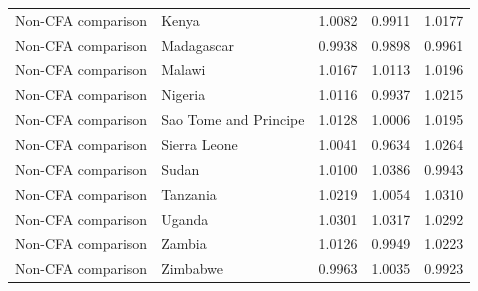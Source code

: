 \begin{table}
\begin{tabular}[t]{llrrr}
Non-CFA comparison & Kenya & 1.0082 & 0.9911 & 1.0177\\
\addlinespace
Non-CFA comparison & Madagascar & 0.9938 & 0.9898 & 0.9961\\
Non-CFA comparison & Malawi & 1.0167 & 1.0113 & 1.0196\\
Non-CFA comparison & Nigeria & 1.0116 & 0.9937 & 1.0215\\
Non-CFA comparison & Sao Tome and Principe & 1.0128 & 1.0006 & 1.0195\\
Non-CFA comparison & Sierra Leone & 1.0041 & 0.9634 & 1.0264\\
\addlinespace
Non-CFA comparison & Sudan & 1.0100 & 1.0386 & 0.9943\\
Non-CFA comparison & Tanzania & 1.0219 & 1.0054 & 1.0310\\
Non-CFA comparison & Uganda & 1.0301 & 1.0317 & 1.0292\\
Non-CFA comparison & Zambia & 1.0126 & 0.9949 & 1.0223\\
Non-CFA comparison & Zimbabwe & 0.9963 & 1.0035 & 0.9923\\
\bottomrule
\end{tabular}
\end{table}